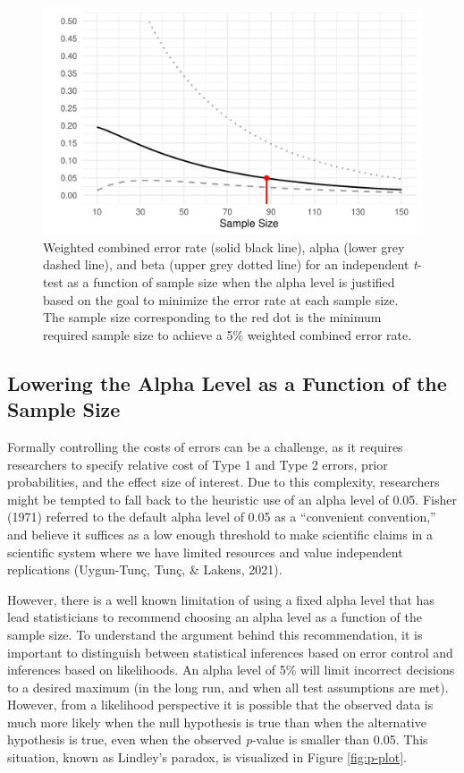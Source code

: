 \documentclass[
  english,
  ,man, a4paper,floatsintext]{apa6}
\begin{document}
\begin{figure}
\centering
\includegraphics{Justify_in_Practice_files/figure-latex/error-plot-1.pdf}
\caption{\label{fig:error-plot}Weighted combined error rate (solid black line), alpha (lower grey dashed line), and beta (upper grey dotted line) for an independent \emph{t}-test as a function of sample size when the alpha level is justified based on the goal to minimize the error rate at each sample size. The sample size corresponding to the red dot is the minimum required sample size to achieve a 5\% weighted combined error rate.}
\end{figure}

\hypertarget{lowering-the-alpha-level-as-a-function-of-the-sample-size}{%
\subsection{Lowering the Alpha Level as a Function of the Sample Size}\label{lowering-the-alpha-level-as-a-function-of-the-sample-size}}

Formally controlling the costs of errors can be a challenge, as it requires researchers to specify relative cost of Type 1 and Type 2 errors, prior probabilities, and the effect size of interest. Due to this complexity, researchers might be tempted to fall back to the heuristic use of an alpha level of 0.05. Fisher (1971) referred to the default alpha level of 0.05 as a ``convenient convention,'' and believe it suffices as a low enough threshold to make scientific claims in a scientific system where we have limited resources and value independent replications (Uygun-Tunç, Tunç, \& Lakens, 2021).

However, there is a well known limitation of using a fixed alpha level that has lead statisticians to recommend choosing an alpha level as a function of the sample size. To understand the argument behind this recommendation, it is important to distinguish between statistical inferences based on error control and inferences based on likelihoods. An alpha level of 5\% will limit incorrect decisions to a desired maximum (in the long run, and when all test assumptions are met). However, from a likelihood perspective it is possible that the observed data is much more likely when the null hypothesis is true than when the alternative hypothesis is true, even when the observed \emph{p}-value is smaller than 0.05. This situation, known as Lindley's paradox, is visualized in Figure \ref{fig:p-plot}.
\end{document}
